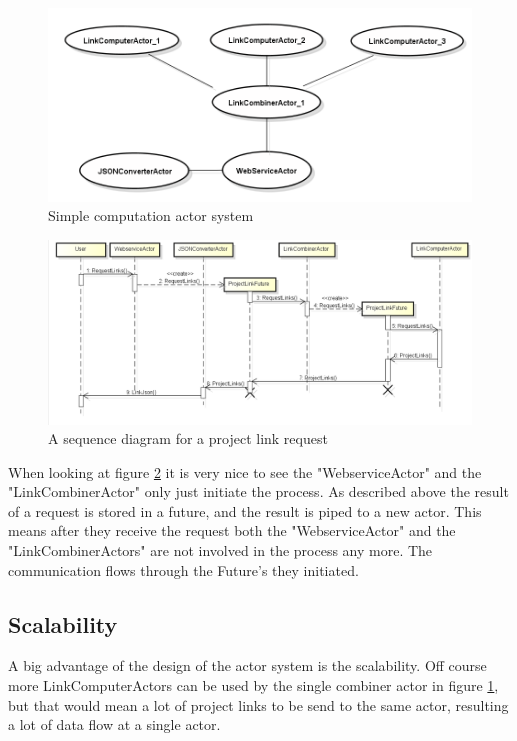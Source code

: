 \documentclass[10pt,a4paper]{article}
\begin{document}
\begin{figure}[htb]
    \centering
    \includegraphics[width=1.00\textwidth]{ActorSystemSample}
    \caption{Simple computation actor system}
    \label{fig:actor_sample}
\end{figure}

\begin{figure}[htb]
    \centering
    \includegraphics[width=1.0\textwidth]{ActorSequence}
    \caption{A sequence diagram for a project link request}
    \label{fig:actor_seq}
\end{figure}


When looking at figure \ref{fig:actor_seq} it is very nice to see the "WebserviceActor" and the "LinkCombinerActor" only just initiate the process. As described above the result of a request is stored in a future, and the result is piped to a new actor. This means after they receive the request both the "WebserviceActor" and the "LinkCombinerActors" are not involved in the process any more. The communication flows through the Future's they initiated.


\subsection{Scalability}

A big advantage of the design of the actor system is the scalability. Off course more LinkComputerActors can be used by the single combiner actor in figure \ref{fig:actor_sample}, but that would mean a lot of project links to be send to the same actor, resulting a lot of data flow at a single actor. 
\end{document}
